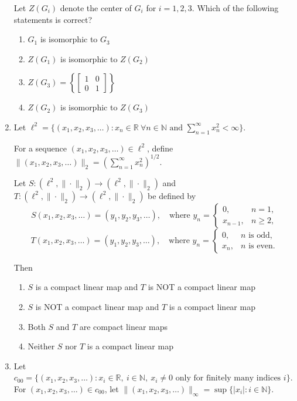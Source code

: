\documentclass[journal,12pt,onecolumn]{IEEEtran}
\theoremstyle{remark}
\begin{document}
\begin{enumerate}[start=1, label=Q.\arabic*]
Let $Z(G_{i})$ denote the center of $G_{i}$ for $i = 1, 2, 3$.  
Which of the following statements is correct?

\begin{enumerate}
\item $G_{1}$ is isomorphic to $G_{3}$
\item $Z(G_{1})$ is isomorphic to $Z(G_{2})$
\item $Z(G_{3}) = \left\{ \begin{bmatrix} 1 & 0 \\ 0 & 1 \end{bmatrix} \right\}$
\item $Z(G_{2})$ is isomorphic to $Z(G_{3})$
\end{enumerate}


\item Let $\ell^{2} = \{(x_{1}, x_{2}, x_{3}, \dots) : x_{n} \in \mathbb{R} \ \forall n \in \mathbb{N} \text{ and } \sum_{n=1}^{\infty} x_{n}^{2} < \infty \}$.

For a sequence $(x_{1}, x_{2}, x_{3}, \dots) \in \ell^{2}$, define $\|(x_{1}, x_{2}, x_{3}, \dots)\|_{2} = \left(\sum_{n=1}^{\infty} x_{n}^{2}\right)^{1/2}$.

Let $S : (\ell^{2}, \|\cdot\|_{2}) \to (\ell^{2}, \|\cdot\|_{2})$ and $T : (\ell^{2}, \|\cdot\|_{2}) \to (\ell^{2}, \|\cdot\|_{2})$ be defined by
\[
S(x_{1}, x_{2}, x_{3}, \dots) = (y_{1}, y_{2}, y_{3}, \dots), \quad \text{where } y_{n} = \begin{cases} 
0, & n=1, \\
x_{n-1}, & n \geq 2,
\end{cases}
\]
\[
T(x_{1}, x_{2}, x_{3}, \dots) = (y_{1}, y_{2}, y_{3}, \dots), \quad \text{where } y_{n} = \begin{cases}
0, & n \text{ is odd}, \\
x_{n}, & n \text{ is even}.
\end{cases}
\]

Then

\begin{enumerate}
\item $S$ is a compact linear map and $T$ is NOT a compact linear map
\item $S$ is NOT a compact linear map and $T$ is a compact linear map
\item Both $S$ and $T$ are compact linear maps
\item Neither $S$ nor $T$ is a compact linear map
\end{enumerate}
\hfill{}
\item Let $c_{00}=\{(x_{1},x_{2},x_{3},\dots): x_{i}\in \mathbb{R},\ i\in \mathbb{N},\ x_{i}\ne 0 \text{ only for finitely many indices } i\}$.  
For $(x_{1},x_{2},x_{3},\dots)\in c_{00}$, let $\lVert(x_{1},x_{2},x_{3},\dots)\rVert_{\infty}=\sup\{|x_{i}|: i\in \mathbb{N}\}$.  


\end{enumerate}
\end{document}
